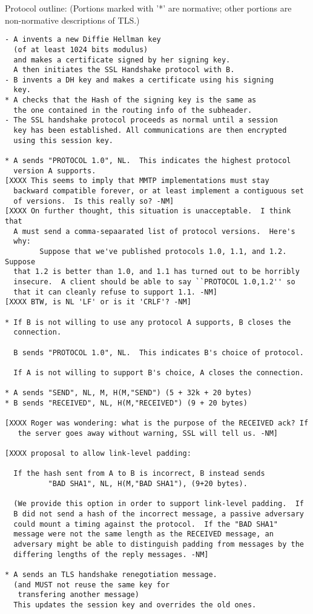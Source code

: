 Protocol outline: (Portions marked with '*' are normative; other
portions are non-normative descriptions of TLS.)

\begin{verbatim}
- A invents a new Diffie Hellman key 
  (of at least 1024 bits modulus)
  and makes a certificate signed by her signing key.
  A then initiates the SSL Handshake protocol with B.
- B invents a DH key and makes a certificate using his signing
  key.
* A checks that the Hash of the signing key is the same as
  the one contained in the routing info of the subheader.
- The SSL handshake protocol proceeds as normal until a session
  key has been established. All communications are then encrypted
  using this session key.

* A sends "PROTOCOL 1.0", NL.  This indicates the highest protocol
  version A supports.
[XXXX This seems to imply that MMTP implementations must stay
  backward compatible forever, or at least implement a contiguous set 
  of versions.  Is this really so? -NM]
[XXXX On further thought, this situation is unacceptable.  I think that 
  A must send a comma-sepaarated list of protocol versions.  Here's
  why:
        Suppose that we've published protocols 1.0, 1.1, and 1.2.  Suppose
  that 1.2 is better than 1.0, and 1.1 has turned out to be horribly 
  insecure.  A client should be able to say ``PROTOCOL 1.0,1.2'' so
  that it can cleanly refuse to support 1.1. -NM] 
[XXXX BTW, is NL 'LF' or is it 'CRLF'? -NM]

* If B is not willing to use any protocol A supports, B closes the 
  connection.

  B sends "PROTOCOL 1.0", NL.  This indicates B's choice of protocol.

  If A is not willing to support B's choice, A closes the connection.

* A sends "SEND", NL, M, H(M,"SEND") (5 + 32k + 20 bytes)
* B sends "RECEIVED", NL, H(M,"RECEIVED") (9 + 20 bytes)

[XXXX Roger was wondering: what is the purpose of the RECEIVED ack? If
   the server goes away without warning, SSL will tell us. -NM]

[XXXX proposal to allow link-level padding:

  If the hash sent from A to B is incorrect, B instead sends
          "BAD SHA1", NL, H(M,"BAD SHA1"), (9+20 bytes).

  (We provide this option in order to support link-level padding.  If
  B did not send a hash of the incorrect message, a passive adversary
  could mount a timing against the protocol.  If the "BAD SHA1"
  message were not the same length as the RECEIVED message, an
  adversary might be able to distinguish padding from messages by the
  differing lengths of the reply messages. -NM]

* A sends an TLS handshake renegotiation message.
  (and MUST not reuse the same key for 
   transfering another message)
  This updates the session key and overrides the old ones.
\end{verbatim}

